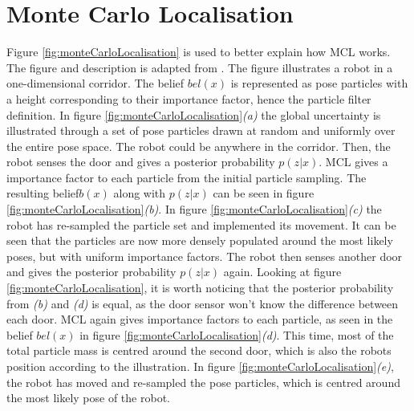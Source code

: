 \section{Monte Carlo Localisation} \label{A:MonteCarloLocalisation}
Figure \ref{fig:monteCarloLocalisation} is used to better explain how MCL works. The figure and description is adapted from \cite{ThrunSebastian2005Pr}. The figure illustrates a robot in a one-dimensional corridor. The belief $bel(x)$ is represented as pose particles with a height corresponding to their importance factor, hence the particle filter definition. In figure \ref{fig:monteCarloLocalisation}\textit{(a)} the global uncertainty is illustrated through a set of pose particles drawn at random and uniformly over the entire pose space. The robot could be anywhere in the corridor. Then, the robot senses the door and gives a posterior probability $p(z|x)$. MCL gives a importance factor to each particle from the initial particle sampling. The resulting belief$b(x)$ along with $p(z|x)$ can be seen in figure \ref{fig:monteCarloLocalisation}\textit{(b)}. In figure \ref{fig:monteCarloLocalisation}\textit{(c)} the robot has re-sampled the particle set and implemented its movement. It can be seen that the particles are now more densely populated around the most likely poses, but with uniform importance factors. The robot then senses another door and gives the posterior probability $p(z|x)$ again. Looking at figure \ref{fig:monteCarloLocalisation}, it is worth noticing that the posterior probability from \textit{(b)} and \textit{(d)} is equal, as the door sensor won't know the difference between each door. MCL again gives importance factors to each particle, as seen in the belief $bel(x)$ in figure \ref{fig:monteCarloLocalisation}\textit{(d)}. This time, most of the total particle mass is centred around the second door, which is also the robots position according to the illustration. In figure \ref{fig:monteCarloLocalisation}\textit{(e)}, the robot has moved and re-sampled the pose particles, which is centred around the most likely pose of the robot.

